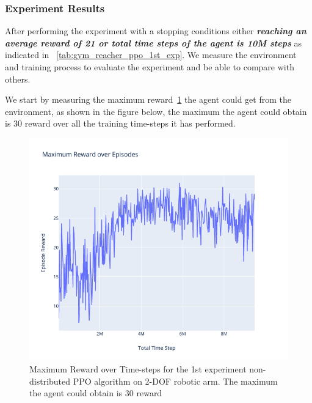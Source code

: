 \subsubsection{Experiment Results}

After performing the experiment with a stopping conditions either \textit{\textbf{reaching an average reward of 21 or total time steps of the agent is 10M steps}} as indicated in ~\ref{tab:gym_reacher_ppo_1st_exp}. We measure the environment and training process to evaluate the experiment and be able to compare with others.

We start by measuring the maximum reward~\ref{fig:1st_exp_max_eps_reward} the agent could get from the environment, as shown in the figure below, the maximum the agent could obtain is 30 reward over all the training time-steps it has performed.
\begin{figure}[H] %
	\centering
	\includegraphics[width=1.2\linewidth]{figures/exps/1st_exp/max_eps_reward}
	\caption{Maximum Reward over Time-steps for the 1st experiment non-distributed PPO algorithm on 2-DOF robotic arm. The maximum the agent could obtain is 30 reward}
	\label{fig:1st_exp_max_eps_reward}
\end{figure}

